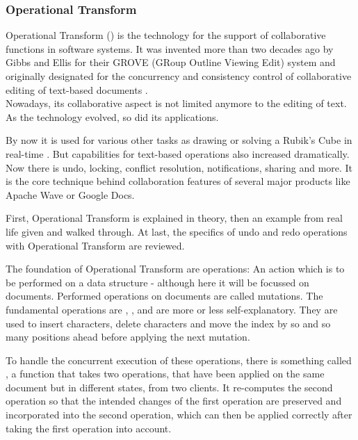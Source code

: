 \subsubsection{Operational Transform}
\label{subsubsec:operational-transform}

Operational Transform () is the technology for the support of collaborative functions in software systems. It was invented more than two decades ago by Gibbs and Ellis for their GROVE (GRoup Outline Viewing Edit) system and originally designated for the concurrency and consistency control of collaborative editing of text-based documents \cite{ellis1989ccigs}. \\ Nowadays, its collaborative aspect is not limited anymore to the editing of text. As the technology evolved, so did its applications. 

By now it is used for various other tasks as drawing or solving a Rubik's Cube in real-time \cite{website:io2013-drive-api-video}. But capabilities for text-based operations also increased dramatically. Now there is undo, locking, conflict resolution, notifications, sharing and more. It is the core technique behind collaboration features of several major products like Apache Wave or Google Docs.

First, Operational Transform is explained in theory, then an example from real life given and walked through. At last, the specifics of undo and redo operations with Operational Transform are reviewed.

\label{subsubsec:ot-theory}

The foundation of Operational Transform are operations: An action which is to be performed on a data structure - although here it will be focussed on documents. Performed operations on documents are called mutations. The fundamental operations are , ,  and are more or less self-explanatory. They are used to insert characters, delete characters and move the index by so and so many positions ahead before applying the next mutation.

To handle the concurrent execution of these operations, there is something called , a function that takes two operations, that have been applied on the same document but in different states, from two clients. It re-computes the second operation so that the intended changes of the first operation are preserved and incorporated into the second operation, which can then be applied correctly after taking the first operation into account.

